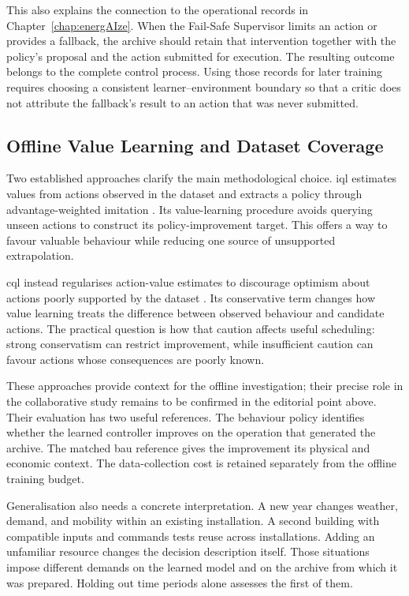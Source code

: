 This also explains the connection to the operational records in Chapter~\ref{chap:energAIze}. When the Fail-Safe Supervisor limits an action or provides a fallback, the archive should retain that intervention together with the policy's proposal and the action submitted for execution. The resulting outcome belongs to the complete control process. Using those records for later training requires choosing a consistent learner--environment boundary so that a critic does not attribute the fallback's result to an action that was never submitted.

\subsection{Offline Value Learning and Dataset Coverage}

Two established approaches clarify the main methodological choice. \gls{iql} estimates values from actions observed in the dataset and extracts a policy through advantage-weighted imitation \parencite{kostrikov2021iql}. Its value-learning procedure avoids querying unseen actions to construct its policy-improvement target. This offers a way to favour valuable behaviour while reducing one source of unsupported extrapolation.

\gls{cql} instead regularises action-value estimates to discourage optimism about actions poorly supported by the dataset \parencite{kumar2020cql}. Its conservative term changes how value learning treats the difference between observed behaviour and candidate actions. The practical question is how that caution affects useful scheduling: strong conservatism can restrict improvement, while insufficient caution can favour actions whose consequences are poorly known.

These approaches provide context for the offline investigation; their precise role in the collaborative study remains to be confirmed in the editorial point above. Their evaluation has two useful references. The behaviour policy identifies whether the learned controller improves on the operation that generated the archive. The matched \gls{bau} reference gives the improvement its physical and economic context. The data-collection cost is retained separately from the offline training budget.

Generalisation also needs a concrete interpretation. A new year changes weather, demand, and mobility within an existing installation. A second building with compatible inputs and commands tests reuse across installations. Adding an unfamiliar resource changes the decision description itself. Those situations impose different demands on the learned model and on the archive from which it was prepared. Holding out time periods alone assesses the first of them.

